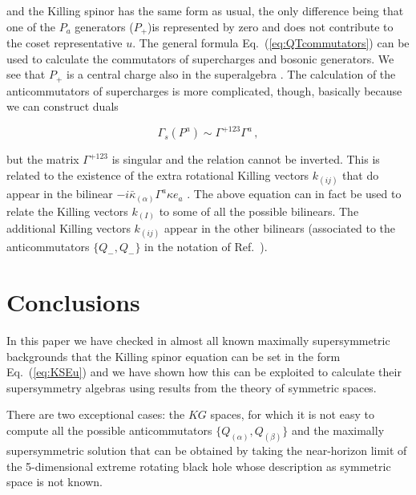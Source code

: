 \documentclass[12pt,a4paper]{article}
\begin{document}
\noindent
and the Killing spinor has the same form as usual, the only difference
being that one of the $P_{a}$ generators ($P_{+}$)is represented by
zero and does not contribute to the coset representative $u$. The
general formula Eq.~(\ref{eq:QTcommutators}) can be used to calculate
the commutators of supercharges and bosonic generators. We see that
$P_{+}$ is a central charge also in the superalgebra
\cite{Figueroa-O'Farrill:2001nz}. The calculation of the
anticommutators of supercharges is more complicated, though, basically
because we can construct duals 

\begin{equation}
\Gamma_{s}(P^{a})\sim \Gamma^{+123}\Gamma^{a}\, ,  
\end{equation}

\noindent
but the matrix $\Gamma^{+123}$ is singular and the relation cannot be
inverted. This is related to the existence of the extra rotational
Killing vectors $k_{(ij)}$ that do appear in the bilinear
$-i\bar{\kappa}_{(\alpha)}\Gamma^{a}\kappa e_{a}$
\cite{Figueroa-O'Farrill:2001nz}. The above equation can in fact be
used to relate the Killing vectors $k_{(I)}$ to some of all the
possible bilinears. The additional Killing vectors $k_{(ij)}$ appear
in the other bilinears (associated to the anticommutators
$\{Q_{-},Q_{-}\}$ in the notation of
Ref.~\cite{Figueroa-O'Farrill:2001nz}).



\section{Conclusions}
\label{sec-conclusions}

In this paper we have checked in almost all known maximally
supersymmetric backgrounds that the Killing spinor equation can be set
in the form Eq.~(\ref{eq:KSEu}) and we have shown how this can be
exploited to calculate their supersymmetry algebras using results from
the theory of symmetric spaces. 

There are two exceptional cases: the $KG$ spaces, for which it is not
easy to compute all the possible anticommutators
$\{Q_{(\alpha)},Q_{(\beta)}\}$ and the maximally supersymmetric
solution that can be obtained by taking the near-horizon limit of the
5-dimensional extreme rotating black hole
\cite{Kallosh:1996vy,Gauntlett:1998fz,Cvetic:1998xh} whose description
as symmetric space is not known.
\end{document}
